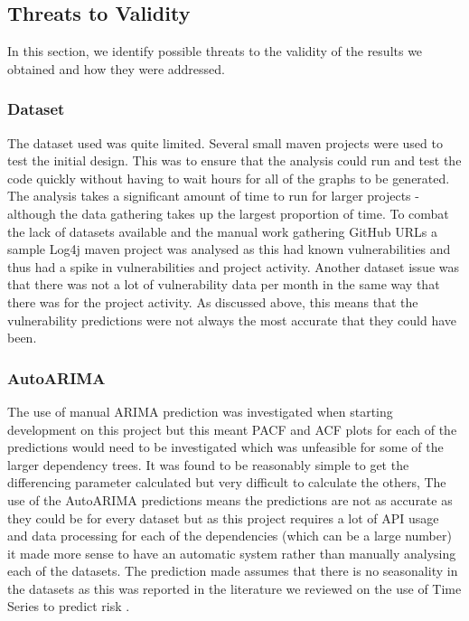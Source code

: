 \documentclass[conference]{IEEEtran}
\begin{document}
{\subsection{Threats to Validity}
In this section, we identify possible threats to the validity of the results we obtained and how they were addressed. 

\subsubsection{Dataset}
The dataset used was quite limited. Several small maven projects were used to test the initial design. This was to ensure that the analysis could run and test the code quickly without having to wait hours for all of the graphs to be generated. The analysis takes a significant amount of time to run for larger projects - although the data gathering takes up the largest proportion of time. To combat the lack of datasets available and the manual work gathering GitHub URLs a sample Log4j maven project was analysed as this had known vulnerabilities and thus had a spike in vulnerabilities and project activity. Another dataset issue was that there was not a lot of vulnerability data per month in the same way that there was for the project activity. As discussed above, this means that the vulnerability predictions were not always the most accurate that they could have been. 

\subsubsection{AutoARIMA}
The use of manual ARIMA prediction was investigated when starting development on this project but this meant PACF and ACF plots for each of the predictions would need to be investigated which was unfeasible for some of the larger dependency trees. It was found to be reasonably simple to get the differencing parameter calculated but very difficult to calculate the others, The use of the AutoARIMA predictions means the predictions are not as accurate as they could be for every dataset but as this project requires a lot of API usage and data processing for each of the dependencies (which can be a large number) it made more sense to have an automatic system rather than manually analysing each of the datasets. The prediction made assumes that there is no seasonality in the datasets as this was reported in the literature we reviewed on the use of Time Series to predict risk \cite{roumani_time_2015}. 

}
\end{document}
